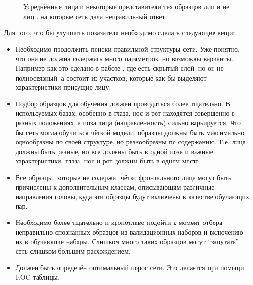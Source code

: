 \documentclass[12pt]{report}
\newenvironment{myItemize}{
 	\vspace{-10pt}
	\begin{itemize}[nolistsep]
}{\end{itemize}}
\begin{document}
\begin{figure}[h]
	\centering
	\hspace{1cm}
	\caption{Усреднённые лица и некоторые представители тех образцов лиц  и не лиц 
, на которые сеть дала неправильный ответ.}
	\label{fig:false_avg}
\end{figure}

Для того, что бы улучшить показатели необходимо сделать следующие вещи:
\begin{myItemize}
\item Необходимо продолжить поиски правильной структуры сети. Уже понятно, что она не должна содержать много 
параметров, но возможны варианты. Например как это сделано в работе \citep{rowley1998neural}, где есть скрытый 
слой, 
но он не полносвязный, а состоит из участков, которые как бы выделяют характеристики присущие лицу.
\item Подбор образцов для обучения должен проводиться более тщательно. В используемых базах, особенно в \citep
{huang2007labeled} глаза, нос и рот находятся совершенно в разных положениях, а поза лица (направленность) сильно 
варьируется. Что бы сеть могла обучиться чёткой модели, образцы должны быть максимально однообразны по своей 
структуре, но разнообразны по содержанию. Т.е. лица должны быть разные, но все должны быть в одной позе и важные 
характеристики: глаза, нос и рот должны быть в одном месте.
\item Все образцы, которые не содержат чётко фронтального лица могут быть причислены к дополнительным классам, 
описывающим различные направления головы, куда эти образцы будут включены в качестве обучающих пар.
\item Необходимо более тщательно и кропотливо подойти к момент отбора неправильно опознанных образцов из 
валидационных наборов и включению их в обучающие наборы. Слишком много таких образцов могут ``запутать'' сеть 
слишком 
большим расхождением.
\item Должен быть определён оптимальный порог сети. Это делается при помощи ROC таблицы.
\end{myItemize}


\end{document}
